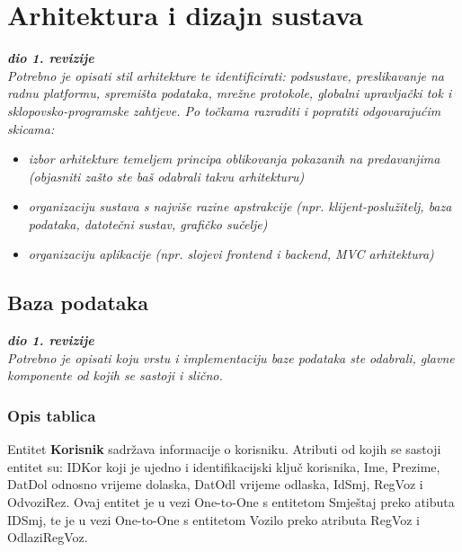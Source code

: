 \chapter{Arhitektura i dizajn sustava}
		
		\textbf{\textit{dio 1. revizije}}\\

		\textit{ Potrebno je opisati stil arhitekture te identificirati: podsustave, preslikavanje na radnu platformu, spremišta podataka, mrežne protokole, globalni upravljački tok i sklopovsko-programske zahtjeve. Po točkama razraditi i popratiti odgovarajućim skicama:}
	\begin{itemize}
		\item 	\textit{izbor arhitekture temeljem principa oblikovanja pokazanih na predavanjima (objasniti zašto ste baš odabrali takvu arhitekturu)}
		\item 	\textit{organizaciju sustava s najviše razine apstrakcije (npr. klijent-poslužitelj, baza podataka, datotečni sustav, grafičko sučelje)}
		\item 	\textit{organizaciju aplikacije (npr. slojevi frontend i backend, MVC arhitektura) }		
	\end{itemize}

	
		

		

				
		\section{Baza podataka}
			
			\textbf{\textit{dio 1. revizije}}\\
			
		\textit{Potrebno je opisati koju vrstu i implementaciju baze podataka ste odabrali, glavne komponente od kojih se sastoji i slično.}
		
			\subsection{Opis tablica}
			
				
				{Entitet \textbf{Korisnik} sadržava informacije o korisniku. Atributi od kojih se sastoji entitet su: IDKor koji je ujedno i identifikacijski ključ korisnika,
				Ime, Prezime, DatDol odnosno vrijeme dolaska, DatOdl vrijeme odlaska, IdSmj, RegVoz i OdvoziRez. Ovaj entitet je u vezi One-to-One s entitetom  Smještaj preko atibuta
				IDSmj, te je u vezi One-to-One s entitetom Vozilo preko atributa RegVoz i OdlaziRegVoz.}
				
